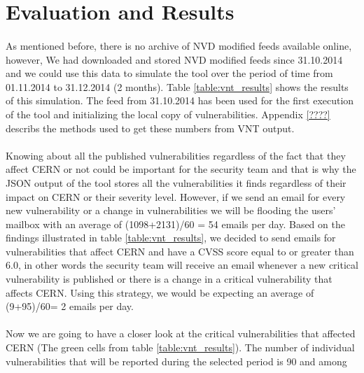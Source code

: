 
\section{Evaluation and Results}

\paragraph{}
As mentioned before, there is no archive of NVD modified feeds available online, however, We had downloaded and stored NVD modified feeds since 31.10.2014 and we could use this data to simulate the tool over the period of time from 01.11.2014 to 31.12.2014 (2 months). Table \ref{table:vnt_results} shows the results of this simulation. The feed from 31.10.2014 has been used for the first execution of the tool and initializing the local copy of vulnerabilities. Appendix \ref{????} describs the methods used to get these numbers from VNT output.
\paragraph{}
Knowing about all the published vulnerabilities regardless of the fact that they affect CERN or not could be important for the security team and that is why the JSON output of the tool stores all the vulnerabilities it finds regardless of their impact on CERN or their severity level. However, if we send an email for every new vulnerability or a change in vulnerabilities we will be flooding the users' mailbox with an average of (1098+2131)/60 = 54 emails per day. Based on the findings illustrated in table \ref{table:vnt_results}, we decided to send emails for vulnerabilities that affect CERN and have a CVSS score equal to or greater than 6.0, in other words the security team will receive an email whenever a new critical vulnerability is published or there is a change in a critical vulnerability that affects CERN. Using this strategy, we would be expecting an average of (9+95)/60= 2 emails per day. 
\paragraph{}
Now we are going to have a closer look at the critical vulnerabilities that affected CERN (The green cells from table \ref{table:vnt_results}). The number of individual vulnerabilities that will be reported during the selected period is 90 and among


